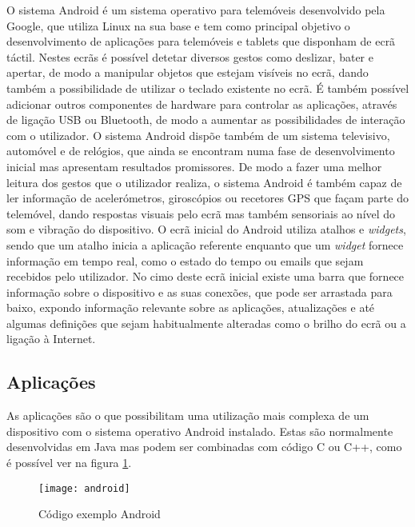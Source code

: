 O sistema Android é um sistema operativo para telemóveis desenvolvido pela Google, que utiliza Linux na sua base e tem como principal objetivo o desenvolvimento de aplicações para telemóveis e tablets que disponham de ecrã táctil.
Nestes ecrãs é possível detetar diversos gestos como deslizar, bater e apertar, de modo a manipular objetos que estejam visíveis no ecrã, dando também a possibilidade de utilizar o teclado existente no ecrã.
É também possível adicionar outros componentes de hardware para controlar as aplicações, através de ligação USB ou Bluetooth, de modo a aumentar as possibilidades de interação com o utilizador.
O sistema Android dispõe também de um sistema televisivo, automóvel e de relógios, que ainda se encontram numa fase de desenvolvimento inicial mas apresentam resultados promissores.
De modo a fazer uma melhor leitura dos gestos que o utilizador realiza, o sistema Android é também capaz de ler informação de acelerómetros, giroscópios ou recetores GPS que façam parte do telemóvel, dando respostas visuais pelo ecrã mas também sensoriais ao nível do som e vibração do dispositivo.
O ecrã inicial do Android utiliza atalhos e \emph{widgets}, sendo que um atalho inicia a aplicação referente enquanto que um \emph{widget} fornece informação em tempo real, como o estado do tempo ou emails que sejam recebidos pelo utilizador.
No cimo deste ecrã inicial existe uma barra que fornece informação sobre o dispositivo e as suas conexões, que pode ser arrastada para baixo, expondo informação relevante sobre as aplicações, atualizações e até algumas definições que sejam habitualmente alteradas como o brilho do ecrã ou a ligação à Internet.

\subsection{Aplicações}
\label{sub:aplicacoes}

As aplicações são o que possibilitam uma utilização mais complexa de um dispositivo com o sistema operativo Android instalado.
Estas são normalmente desenvolvidas em Java mas podem ser combinadas com código C ou C++, como é possível ver na figura \ref{fig:android}.

\begin{figure}[hbtp]
	\centering
	\texttt{[image: android]}
	\caption[Código exemplo Android]{Código exemplo Android}
	\label{fig:android}
\end{figure}


